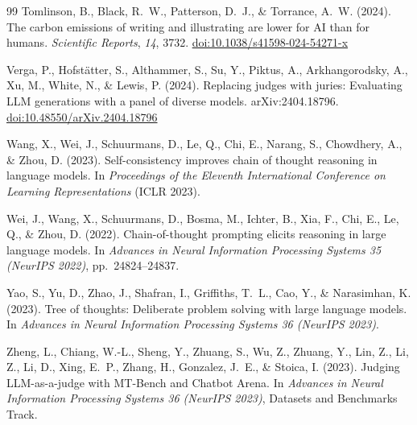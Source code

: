 \documentclass[12pt,a4paper]{article}
\begin{document}
\begin{thebibliography}{99}
Tomlinson, B., Black, R.~W., Patterson, D.~J., \& Torrance, A.~W. (2024).
The carbon emissions of writing and illustrating are lower for AI than for
  humans.
\textit{Scientific Reports}, \textit{14}, 3732.
\href{https://doi.org/10.1038/s41598-024-54271-x}{doi:10.1038/s41598-024-54271-x}

Verga, P., Hofst\"atter, S., Althammer, S., Su, Y., Piktus, A.,
  Arkhangorodsky, A., Xu, M., White, N., \& Lewis, P. (2024).
Replacing judges with juries: Evaluating LLM generations with a panel of diverse
  models.
arXiv:2404.18796.
\href{https://doi.org/10.48550/arXiv.2404.18796}{doi:10.48550/arXiv.2404.18796}

Wang, X., Wei, J., Schuurmans, D., Le, Q., Chi, E., Narang, S., Chowdhery, A.,
  \& Zhou, D. (2023).
Self-consistency improves chain of thought reasoning in language models.
In \textit{Proceedings of the Eleventh International Conference on Learning
  Representations} (ICLR 2023).

Wei, J., Wang, X., Schuurmans, D., Bosma, M., Ichter, B., Xia, F., Chi, E.,
  Le, Q., \& Zhou, D. (2022).
Chain-of-thought prompting elicits reasoning in large language models.
In \textit{Advances in Neural Information Processing Systems 35 (NeurIPS 2022)},
  pp.~24824--24837.

Yao, S., Yu, D., Zhao, J., Shafran, I., Griffiths, T.~L., Cao, Y., \&
  Narasimhan, K. (2023).
Tree of thoughts: Deliberate problem solving with large language models.
In \textit{Advances in Neural Information Processing Systems 36 (NeurIPS 2023)}.

Zheng, L., Chiang, W.-L., Sheng, Y., Zhuang, S., Wu, Z., Zhuang, Y., Lin, Z.,
  Li, Z., Li, D., Xing, E.~P., Zhang, H., Gonzalez, J.~E., \& Stoica, I.
  (2023).
Judging LLM-as-a-judge with MT-Bench and Chatbot Arena.
In \textit{Advances in Neural Information Processing Systems 36 (NeurIPS 2023)},
  Datasets and Benchmarks Track.

\end{thebibliography}
\end{document}
